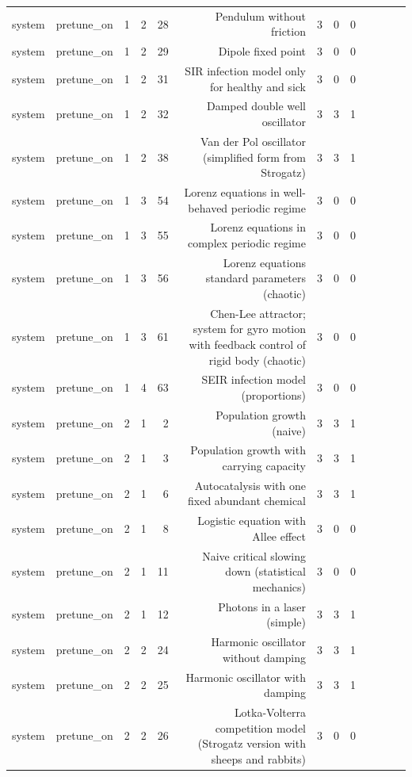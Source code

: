 \begin{table}[htbp]
\begin{tabular}{lrrrrrrrrrrrr}
system & pretune\_on & 1 & 2 & 28 & Pendulum without friction & 3 & 0 & 0 &  &  &  &  \\
system & pretune\_on & 1 & 2 & 29 & Dipole fixed point & 3 & 0 & 0 &  &  &  &  \\
system & pretune\_on & 1 & 2 & 31 & SIR infection model only for healthy and sick & 3 & 0 & 0 &  &  &  &  \\
system & pretune\_on & 1 & 2 & 32 & Damped double well oscillator & 3 & 3 & 1 &  &  &  &  \\
system & pretune\_on & 1 & 2 & 38 & Van der Pol oscillator (simplified form from Strogatz) & 3 & 3 & 1 &  &  &  &  \\
system & pretune\_on & 1 & 3 & 54 & Lorenz equations in well-behaved periodic regime & 3 & 0 & 0 &  &  &  &  \\
system & pretune\_on & 1 & 3 & 55 & Lorenz equations in complex periodic regime & 3 & 0 & 0 &  &  &  &  \\
system & pretune\_on & 1 & 3 & 56 & Lorenz equations standard parameters (chaotic) & 3 & 0 & 0 &  &  &  &  \\
system & pretune\_on & 1 & 3 & 61 & Chen-Lee attractor; system for gyro motion with feedback control of rigid body (chaotic) & 3 & 0 & 0 &  &  &  &  \\
system & pretune\_on & 1 & 4 & 63 & SEIR infection model (proportions) & 3 & 0 & 0 &  &  &  &  \\
system & pretune\_on & 2 & 1 & 2 & Population growth (naive) & 3 & 3 & 1 &  &  &  &  \\
system & pretune\_on & 2 & 1 & 3 & Population growth with carrying capacity & 3 & 3 & 1 &  &  &  &  \\
system & pretune\_on & 2 & 1 & 6 & Autocatalysis with one fixed abundant chemical & 3 & 3 & 1 &  &  &  &  \\
system & pretune\_on & 2 & 1 & 8 & Logistic equation with Allee effect & 3 & 0 & 0 &  &  &  &  \\
system & pretune\_on & 2 & 1 & 11 & Naive critical slowing down (statistical mechanics) & 3 & 0 & 0 &  &  &  &  \\
system & pretune\_on & 2 & 1 & 12 & Photons in a laser (simple) & 3 & 3 & 1 &  &  &  &  \\
system & pretune\_on & 2 & 2 & 24 & Harmonic oscillator without damping & 3 & 3 & 1 &  &  &  &  \\
system & pretune\_on & 2 & 2 & 25 & Harmonic oscillator with damping & 3 & 3 & 1 &  &  &  &  \\
system & pretune\_on & 2 & 2 & 26 & Lotka-Volterra competition model (Strogatz version with sheeps and rabbits) & 3 & 0 & 0 &  &  &  &  \\

\end{tabular}
\end{table}
